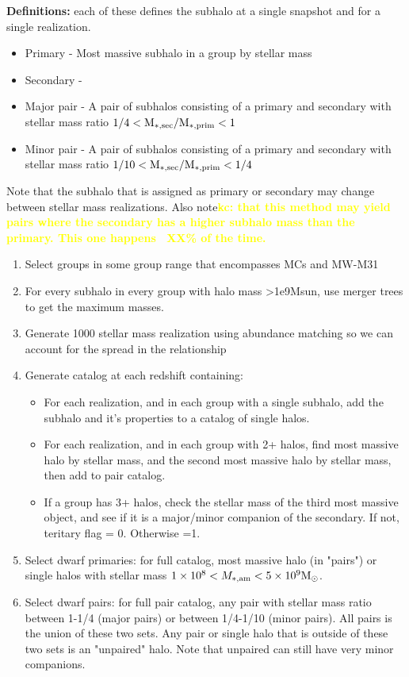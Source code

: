 \documentclass[twocolumn]{aastex631}
\newcommand{\kc}[1]{\textcolor{yellow}{\textbf{kc: #1}} }
\begin{document}
\textbf{Definitions:} each of these defines the subhalo at a single snapshot and for a single realization.
\begin{itemize}
  \item Primary - Most massive subhalo in a group by stellar mass
  \item Secondary - 
  \item Major pair - A pair of subhalos consisting of a primary and secondary with stellar mass ratio $1/4 < \rm M_{*,sec}/M_{*, prim} < 1$
  \item Minor pair - A pair of subhalos consisting of a primary and secondary with stellar mass ratio $1/10 < \rm M_{*,sec}/M_{*, prim} < 1/4$
\end{itemize}
Note that the subhalo that is assigned as primary or secondary may change between stellar mass realizations. Also note\kc{that this method may yield pairs where the secondary has a higher subhalo mass than the primary. This one happens ~XX\% of the time.}

\begin{enumerate}
  \item Select groups in some group range that encompasses MCs and MW-M31
  \item For every subhalo in every group with halo mass >1e9Msun, use merger trees to get the maximum masses.
  \item Generate 1000 stellar mass realization using abundance matching so we can account for the spread in the relationship
  \item Generate catalog at each redshift containing: 
  \begin{itemize}
    \item For each realization, and in each group with a single subhalo, add the subhalo and it's properties to a catalog of single halos.
    \item For each realization, and in each group with 2+ halos, find most massive halo by stellar mass, and the second most massive halo by stellar mass, then add to pair catalog. 
    \item If a group has 3+ halos, check the stellar mass of the third most massive object, and see if it is a major/minor companion of the secondary. If not, teritary flag = 0. Otherwise =1.
  \end{itemize}
  \item Select dwarf primaries: for full catalog, most massive halo (in "pairs") or single halos with stellar mass $1\times10^{8} < M_{*,\mathrm{am}} < 5\times10^{9} \mathrm{M}_\odot$. 
  \item Select dwarf pairs: for full pair catalog, any pair with stellar mass ratio between 1-1/4 (major pairs) or between 1/4-1/10 (minor pairs). All pairs is the union of these two sets. Any pair or single halo that is outside of these two sets is an "unpaired" halo. Note that unpaired can still have very minor companions. 
\end{enumerate}
\end{document}
